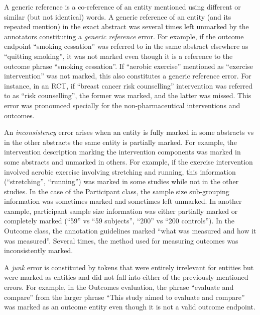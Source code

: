 \documentclass[10.7pt,]{article}
\begin{document}
A generic reference is a co-reference of an entity mentioned using different or similar (but not identical) words. 
A generic reference of an entity (and its repeated mention) in the exact abstract was several times left unmarked by the annotators constituting a \textit{generic reference} error.
For example, if the outcome endpoint ``smoking cessation'' was referred to in the same abstract elsewhere as ``quitting smoking'', it was not marked even though it is a reference to the outcome phrase ``smoking cessation''.
If ``aerobic exercise'' mentioned as ``exercise intervention'' was not marked, this also constitutes a generic reference error.
For instance, in an RCT, if ``breast cancer risk counselling'' intervention was referred to as ``risk counselling'', the former was marked, and the latter was missed.
This error was pronounced specially for the non-pharmaceutical interventions and outcomes.

An \textit{inconsistency} error arises when an entity is fully marked in some abstracts vs in the other abstracts the same entity is partially marked. 
For example, the intervention description marking the intervention components was marked in some abstracts and unmarked in others.
For example, if the exercise intervention involved aerobic exercise involving stretching and running, this information (``stretching'', ``running'') was marked in some studies while not in the other studies.
In the case of the Participant class, the sample size sub-grouping information was sometimes marked and sometimes left unmarked.
In another example, participant sample size information was either partially marked or completely marked (``59'' vs ``59 subjects'', ``200'' vs ``200 controls'').
In the Outcome class, the annotation guidelines marked ``what was measured and how it was measured''. 
Several times, the method used for measuring outcomes was inconsistently marked.

A \textit{junk} error is constituted by tokens that were entirely irrelevant for entities but were marked as entities and did not fall into either of the previously mentioned errors.
For example, in the Outcomes evaluation, the phrase ``evaluate and compare'' from the larger phrase ``This study aimed to evaluate and compare'' was marked as an outcome entity even though it is not a valid outcome endpoint.
\end{document}
